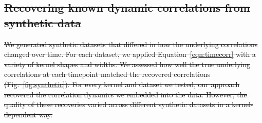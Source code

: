 \documentclass[english]{article}
\providecommand{\DIFdeltex}[1]{{\protect\color{red}\sout{#1}}}                      %
\providecommand{\DIFdel}[1]{\texorpdfstring{\DIFdeltex{#1}}{}} %
\begin{document}
\subsection*{\DIFdel{Recovering known dynamic correlations from synthetic data}}
\DIFdel{We generated synthetic datasets that differed in how the underlying
correlations changed over time.  For each dataset, we applied
Equation~\ref{eqn:timecorr} with a variety of kernel shapes and
widths.  We assessed how well the true underlying correlations at each
timepoint matched the recovered correlations
(Fig.~\ref{fig:synthetic}).  For every kernel and dataset we tested,
our approach recovered the correlation dynamics we embedded into the
data.  However, the quality of these recoveries varied across
different synthetic datasets in a kernel-dependent way.
}%
\end{document}
